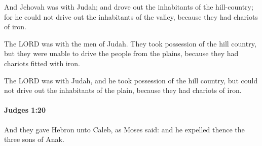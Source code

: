 			\begin{versebox}
					\item[BHS] 
					\item[ASV] And Jehovah was with Judah; and drove out the inhabitants of the hill-country; for he could not drive out the inhabitants of the valley, because they had chariots of iron.
					\item[NIV] The LORD was with the men of Judah. They took possession of the hill country, but they were unable to drive the people from the plains, because they had chariots fitted with iron.
					\item[NRSV] The LORD was with Judah, and he took possession of the hill country, but could not drive out the inhabitants of the plain, because they had chariots of iron.
			\end{versebox}

		\paragraph{Judges 1:20} %
			\label{JUDGES-1-20}

			And they gave Hebron unto Caleb, as Moses said: and he expelled thence the three sons of Anak.

